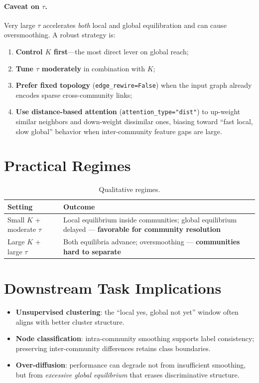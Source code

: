 \documentclass[11pt,a4paper]{report}
\begin{document}
\paragraph{Caveat on $\tau$.}
Very large $\tau$ accelerates \emph{both} local and global equilibration and can cause oversmoothing. A robust strategy is:
\begin{enumerate}[noitemsep]
    \item \textbf{Control $K$ first}---the most direct lever on global reach;
    \item \textbf{Tune $\tau$ moderately} in combination with $K$;
    \item \textbf{Prefer fixed topology} (\texttt{edge\_rewire=False}) when the input graph already encodes sparse cross-community links;
    \item \textbf{Use distance-based attention} (\texttt{attention\_type="dist"}) to up-weight similar neighbors and down-weight dissimilar ones, biasing toward ``fast local, slow global'' behavior when inter-community feature gaps are large.
\end{enumerate}

\section{Practical Regimes}

\begin{table}[h]
\centering
\caption{Qualitative regimes.}
\begin{tabular}{@{}ll@{}}
\toprule
\textbf{Setting} & \textbf{Outcome} \\
\midrule
Small $K$ + moderate $\tau$ & Local equilibrium inside communities; global equilibrium delayed --- \textbf{favorable for community resolution} \\
Large $K$ + large $\tau$       & Both equilibria advance; oversmoothing --- \textbf{communities hard to separate} \\
\bottomrule
\end{tabular}
\end{table}

\section{Downstream Task Implications}

\begin{itemize}[noitemsep]
    \item \textbf{Unsupervised clustering}: the ``local yes, global not yet'' window often aligns with better cluster structure.
    \item \textbf{Node classification}: intra-community smoothing supports label consistency; preserving inter-community differences retains class boundaries.
    \item \textbf{Over-diffusion}: performance can degrade not from insufficient smoothing, but from \emph{excessive global equilibrium} that erases discriminative structure.
\end{itemize}
\end{document}

